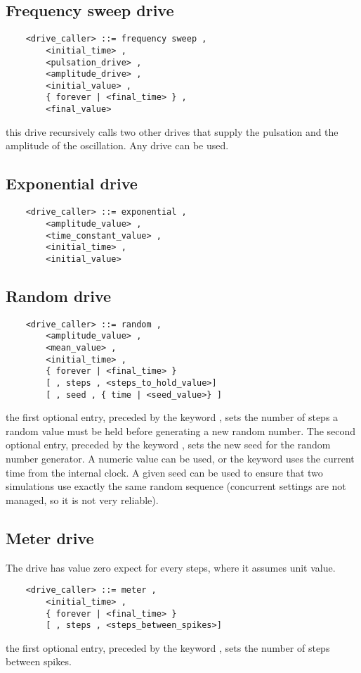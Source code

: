 \subsection{Frequency sweep drive}
\begin{verbatim}
    <drive_caller> ::= frequency sweep ,
        <initial_time> ,
        <pulsation_drive> ,
        <amplitude_drive> ,
        <initial_value> ,
        { forever | <final_time> } ,
        <final_value>
\end{verbatim}
this drive recursively calls two other drives that supply the pulsation 
and the amplitude of the oscillation. Any drive can be used.

\subsection{Exponential drive}
\begin{verbatim}
    <drive_caller> ::= exponential ,
        <amplitude_value> ,
        <time_constant_value> ,
        <initial_time> ,
        <initial_value>
\end{verbatim}

\subsection{Random drive}
\begin{verbatim}
    <drive_caller> ::= random ,
        <amplitude_value> ,
        <mean_value> ,
        <initial_time> ,
        { forever | <final_time> }
        [ , steps , <steps_to_hold_value>]
        [ , seed , { time | <seed_value>} ]
\end{verbatim}
the first optional entry, preceded by the keyword , sets the
number of steps a random value must be held before generating a new
random number. The second optional entry, preceded by the keyword
, sets the new seed for the random number generator. A numeric
value can be used, or the keyword  uses the current time from
the internal clock. A given seed can be used to ensure that two
simulations use exactly the same random sequence (concurrent settings 
are not managed, so it is not very reliable).

\subsection{Meter drive}
The  drive has value zero expect for every  steps,
where it assumes unit value.
\begin{verbatim}
    <drive_caller> ::= meter ,
        <initial_time> ,
        { forever | <final_time> }
        [ , steps , <steps_between_spikes>]
\end{verbatim}
the first optional entry, preceded by the keyword , sets the
number of steps between spikes.

